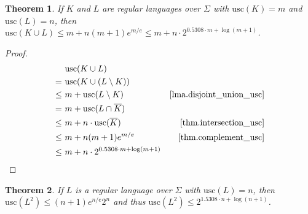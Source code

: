 \documentclass{report}
\newtheorem{theorem}{Theorem}[section]
\theoremstyle{definition}
\begin{document}
\begin{theorem} \label{thm.union_usc}
If $K$ and $L$ are regular languages over $\Sigma$ with $\mathrm{usc}(K) = m$
and $\mathrm{usc}(L) = n$, then $\mathrm{usc}(K \cup L) \leq m + n (m + 1) e^{m / e}
\leq m + n \cdot 2^{0.5308 \cdot m + \log (m + 1)}$.
\end{theorem}

\begin{proof}
\begin{align*}
& \mathrm{usc}(K \cup L) \\
= \ & \mathrm{usc}(K \cup (L \setminus K)) \\
\leq \ & m + \mathrm{usc}(L \setminus K)
& \text{\cref{lma.disjoint_union_usc}} \\
= \ & m + \mathrm{usc}(L \cap \overline{K}) \\
\leq \ & m + n \cdot \mathrm{usc}(\overline{K})
& \text{\cref{thm.intersection_usc}} \\
\leq \ & m + n (m + 1) e^{m / e}
& \text{\cref{thm.complement_usc}} \\
\leq \ & m + n \cdot 2^{0.5308 \cdot m + \log (m + 1)}
\end{align*}
\end{proof}

\begin{theorem} \label{thm.square_usc}
If $L$ is a regular language over $\Sigma$ with $\mathrm{usc}(L) = n$, then
$\mathrm{usc}(L^2) \leq (n + 1) e^{n / e} 2^n$ and thus 
$\mathrm{usc}(L^2) \leq 2^{1.5308 \cdot n + \log (n + 1)}$.
\end{theorem}
\end{document}
